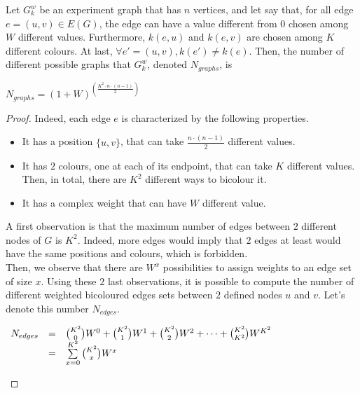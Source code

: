 \begin{observation}
    Let $G_k^w$ be an experiment graph that has $n$ vertices, and let say that, for all edge $e = (u, v) \in E(G)$, the edge can have a value different from $0$ chosen among $W$ different values.
    Furthermore, $k(e, u)$ and $k(e, v)$ are chosen among $K$ different colours.
    At last, $\forall e' = (u, v), k(e') \neq k(e)$.
    Then, the number of different possible graphs that $G_k^w$, denoted $N_{graphs}$, is

    \begin{center}
        $N_{graphs} = (1 + W)^{\left(\frac{K^2 \cdot n \cdot (n-1)}{2}\right)}$
    \end{center}
\end{observation}


\begin{proof}
    Indeed, each edge $e$ is characterized by the following properties.
    \begin{itemize}
        \item It has a position $\{u, v\}$, that can take $\frac{n \cdot (n -1)}{2}$ different values.
        \item It has $2$ colours, one at each of its endpoint, that can take $K$ different values.
            Then, in total, there are $K^2$ different ways to bicolour it.
        \item It has a complex weight that can have $W$ different value.
    \end{itemize}

    A first observation is that the maximum number of edges between $2$ different nodes of $G$ is $K^2$.
    Indeed, more edges would imply that $2$ edges at least would have the same positions and colours, which is forbidden.\\

    Then, we observe that there are $W^x$ possibilities to assign weights to an edge set of size $x$.
    Using these $2$ last observations, it is possible to compute the number of different weighted bicoloured edges sets between $2$ defined nodes $u$ and $v$.
    Let's denote this number $N_{edges}$.

    \begin{center}
        $\begin{array}{r c l}
             N_{edges} & = & {K^2 \choose 0} W^0 + {K^2 \choose 1} W^1 + {K^2 \choose 2} W^2 + \cdots + {K^2 \choose K^2} W^{K^2} \\
                       & = & \sum\limits_{x=0}^{K^2} {K^2 \choose x} W^x
        \end{array}$
    \end{center}


\end{proof}
